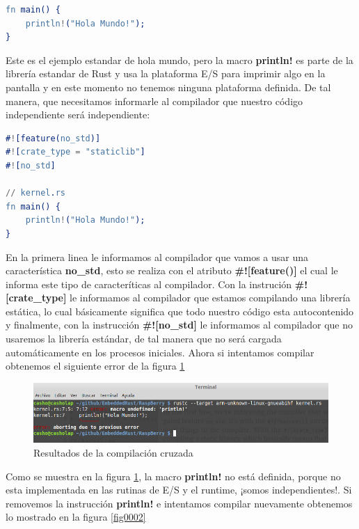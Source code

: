 \documentclass[12pt, twoside]{report}
\begin{document}
\begin{lstlisting}[language=erlang]
fn main() {
	println!("Hola Mundo!");
}
\end{lstlisting}

Este es el ejemplo estandar de hola mundo, pero la macro \textbf{println!} es parte de la librería estandar de Rust y usa la plataforma E/S para imprimir algo en la pantalla y en este momento no tenemos ninguna plataforma definida. De tal manera, que necesitamos informarle al compilador que nuestro código independiente será independiente:

\begin{lstlisting}[language=erlang]
#![feature(no_std)]
#![crate_type = "staticlib"]
#![no_std]

// kernel.rs
fn main() {  
    println!("Hola Mundo!");
}
\end{lstlisting}

En la primera linea le informamos al compilador que vamos a usar una característica \textbf{no\_std}, esto se realiza con el atributo  \textbf{\#![feature()]} el cual le informa este tipo de caracteríticas al compilador. Con la instrución \textbf{\#![crate\_type]} le informamos al compilador que estamos compilando una librería estática, lo cual básicamente significa que todo nuestro código esta autocontenido y finalmente, con la instrucción \textbf{\#![no\_std]} le informamos al compilador que no usaremos la librería estándar, de tal manera que no será cargada automáticamente en los procesos iniciales. Ahora si intentamos compilar obtenemos el siguiente error de la figura \ref{fig0001}

\begin{figure}
	\centering
	\includegraphics[width=1\linewidth]{rust_kernel1.png}
	\caption{Resultados de la compilación cruzada}
	\label{fig0001}
\end{figure}

Como se muestra en la figura \ref{fig0001}, la macro \textbf{println!} no está definida, porque no esta implementada en las rutinas de E/S y el runtime, ¡somos independientes!. Si removemos la instrucción \textbf{println!} e intentamos compilar nuevamente obtenemos lo mostrado en la figura \ref{fig0002}
\end{document}
